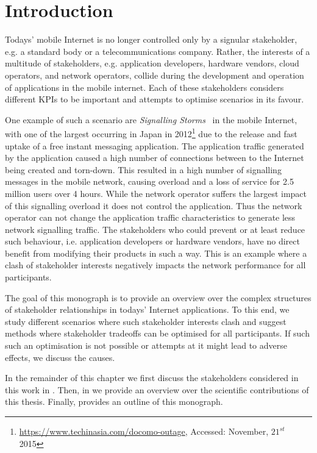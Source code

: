 \chapter{Introduction}\label{chap:introduction}

Todays' mobile Internet is no longer controlled only by a signular stakeholder, e.g. a standard body or a telecommunications company.
Rather, the interests of a multitude of stakeholders, e.g. application developers, hardware vendors, cloud operators, and network operators, collide during the development and operation of applications in the mobile internet. 
Each of these stakeholders considers different \glspl{KPI} to be important and attempts to optimise scenarios in its favour. 

One example of such a scenario are \emph{Signalling Storms}~\cite{Huawei2011} in the mobile Internet, with one of the largest occurring in Japan in 2012\footnote{\url{https://www.techinasia.com/docomo-outage}, Accessed: November, \(21^{st}\) 2015} due to the release and fast uptake of a free instant messaging application.
The application traffic generated by the application caused a high number of connections between to the Internet being created and torn-down.
This resulted in a high number of signalling messages in the mobile network, causing overload and a loss of service for 2.5 million users over 4 hours.
While the network operator suffers the largest impact of this signalling overload it does not control the application.
Thus the network operator can not change the application traffic characteristics to generate less network signalling traffic. 
The stakeholders who could prevent or at least reduce such behaviour, i.e. application developers or hardware vendors, have no direct benefit from modifying their products in such a way.
This is an example where a clash of stakeholder interests negatively impacts the network performance for all participants.

The goal of this monograph is to provide an overview over the complex structures of stakeholder relationships in todays' Internet applications.
To this end, we study different scenarios where such stakeholder interests clash and suggest methods where stakeholder tradeoffs can be optimised for all participants.
If such such an optimisation is not possible or attempts at it might lead to adverse effects, we discuss the causes.

In the remainder of this chapter we first discuss the stakeholders considered in this work in .
Then, in  we provide an overview over the scientific contributions of this thesis.
Finally,  provides an outline of this monograph.

